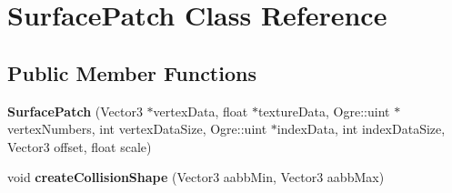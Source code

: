 \hypertarget{classSurfacePatch}{
\section{\-Surface\-Patch \-Class \-Reference}
\label{d4/d37/classSurfacePatch}
}
\subsection*{\-Public \-Member \-Functions}
\begin{DoxyCompactItemize}
\item 
\hypertarget{classSurfacePatch_a8e4f7752702f4a172387cd35b32723f0}{
{\bfseries \-Surface\-Patch} (\-Vector3 $\ast$vertex\-Data, float $\ast$texture\-Data, \-Ogre\-::uint $\ast$vertex\-Numbers, int vertex\-Data\-Size, \-Ogre\-::uint $\ast$index\-Data, int index\-Data\-Size, \-Vector3 offset, float scale)}
\label{d4/d37/classSurfacePatch_a8e4f7752702f4a172387cd35b32723f0}

\item 
\hypertarget{classSurfacePatch_a6f944b74054c5866112e5a56410f471c}{
void {\bfseries create\-Collision\-Shape} (\-Vector3 aabb\-Min, \-Vector3 aabb\-Max)}
\label{d4/d37/classSurfacePatch_a6f944b74054c5866112e5a56410f471c}

\end{DoxyCompactItemize}
